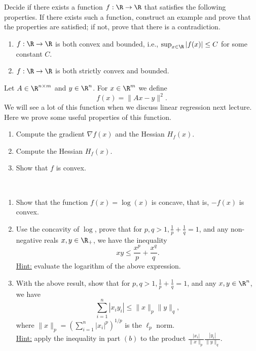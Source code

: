 \documentclass[11pt,nocut]{article}
\begin{document}
	
	
	
	\vspace{5mm}

\begin{problem}[2 points]
	Decide if there exists a function $f: \R\to\R$ that satisfies the following properties. If there exists such a function, construct an example and prove that the properties are satisfied; if not, prove that there is a contradiction.
	\begin{enumerate}[label=\normalfont(\textbf{\alph*})]
		\item $f: \R\to\R$ is both convex and bounded, i.e., $\sup_{x\in\R} |f(x)| \le C$ for some constant $C$. 
		\item $f: \R\to\R$ is both strictly convex and bounded. 
	\end{enumerate}
\end{problem}

\vspace{5mm}


\begin{problem}[3 points]
	Let $A \in \R^{n \times m}$ and $y \in \R^n$.
	For $x \in \R^m$ we define
	$$
	f(x) = \|Ax-y\|^2.
	$$
	We will see a lot of this function when we discuss linear regression next lecture. Here we prove some useful properties of this function.
	\begin{enumerate}[label=\normalfont(\textbf{\alph*})]
		\item Compute the gradient $\nabla f(x)$ and the Hessian $H_f(x)$. 
            \item Compute the Hessian $H_f(x)$. 
		\item Show that $f$ is convex. 
	\end{enumerate}
\end{problem}


\vspace{5mm}

\begin{problem}[3 points] ~
\begin{enumerate}[label=\normalfont(\textbf{\alph*})]
\item Show that the function $f(x) = \log(x)$ is concave, that is, $-f(x)$ is convex. 
\item Use the concavity of $\log$, prove that for $p,q>1, \frac{1}{p} + \frac{1}{q} = 1$, and any non-negative reals $x,y\in\R_+$, we have the inequality
$$
xy \le \frac{x^p}{p} + \frac{x^q}{q}. 
$$
\underline{Hint:} evaluate the logarithm of the above expression.  
\item With the above result, show that for $p,q>1, \frac{1}{p} + \frac{1}{q} = 1$, and any $x,y\in\R^n$, we have
$$
\sum_{i=1}^n |x_i y_i| \le \|x\|_p\|y\|_q,  
$$
where $\|x\|_p = \left(\sum_{i=1}^n |x_i|^p\right)^{1/p}$ is the $\ell_p$ norm. \\
\underline{Hint:} apply the inequality in part $(b)$ to the product $\frac{|x_i|}{\|x\|_p}\frac{|y_i|}{\|y\|_q}$. 
\end{enumerate}
\end{problem}
\end{document}
